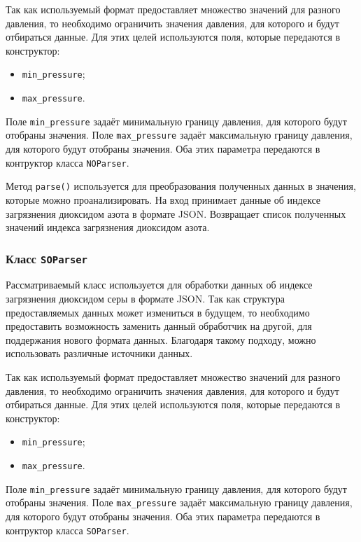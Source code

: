 Так как используемый формат предоставляет множество значений для разного давления, то необходимо ограничить значения давления, для которого и будут отбираться данные.
Для этих целей используются поля, которые передаются в конструктор:
\begin{itemize}
    \item \texttt{min\_pressure};
    \item \texttt{max\_pressure}.
\end{itemize}

Поле \texttt{min\_pressure} задаёт минимальную границу давления, для которого будут отобраны значения.
Поле \texttt{max\_pressure} задаёт максимальную границу давления, для которого будут отобраны значения.
Оба этих параметра передаются в контруктор класса \texttt{NOParser}.

Метод \texttt{parse()} используется для преобразования полученных данных в значения, которые можно проанализировать.
На вход принимает данные об индексе загрязнения диоксидом азота в формате JSON.
Возвращает список полученных значений индекса загрязнения диоксидом азота.





\subsubsection{Класс \texttt{SOParser}}
Рассматриваемый класс используется для обработки данных об индексе загрязнения диоксидом серы в формате JSON.
Так как структура предоставляемых данных может измениться в будущем, то необходимо предоставить возможность заменить данный обработчик на другой, для поддержания нового формата данных.
Благодаря такому подходу, можно использовать различные источники данных.

Так как используемый формат предоставляет множество значений для разного давления, то необходимо ограничить значения давления, для которого и будут отбираться данные.
Для этих целей используются поля, которые передаются в конструктор:
\begin{itemize}
    \item \texttt{min\_pressure};
    \item \texttt{max\_pressure}.
\end{itemize}

Поле \texttt{min\_pressure} задаёт минимальную границу давления, для которого будут отобраны значения.
Поле \texttt{max\_pressure} задаёт максимальную границу давления, для которого будут отобраны значения.
Оба этих параметра передаются в контруктор класса \texttt{SOParser}.

